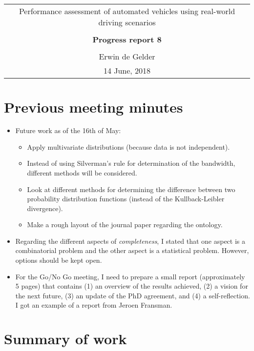 \documentclass[10pt,final,a4paper,oneside,onecolumn]{article}
\newcommand{\progressreportnumber}{8}
\renewcommand{\author}{Erwin de Gelder}
\renewcommand{\date}{14 June, 2018}
\renewcommand{\title}{Performance assessment of automated vehicles using real-world driving scenarios}
\begin{document}
	
\begin{center}
	\begin{tabular}{c}
		\title \\ \\
		\textbf{\huge Progress report \progressreportnumber} \\ \\
		\author \\ 
		\date
	\end{tabular}
\end{center}

\section{Previous meeting minutes}

\begin{itemize}
	\item Future work as of the 16th of May:
	\begin{itemize}
		\item Apply multivariate distributions (because data is not independent).
		\item Instead of using Silverman's rule for determination of the bandwidth, different methods will be considered.
		\item Look at different methods for determining the difference between two probability distribution functions (instead of the Kullback-Leibler divergence).
		\item Make a rough layout of the journal paper regarding the ontology.
	\end{itemize}
	\item Regarding the different aspects of \emph{completeness}, I stated that one aspect is a combinatorial problem and the other aspect is a statistical problem. However, options should be kept open.
	\item For the Go/No Go meeting, I need to prepare a small report (approximately 5 pages) that contains (1) an overview of the results achieved, (2) a vision for the next future, (3) an update of the PhD agreement, and (4) a self-reflection. I got an example of a report from Jeroen Fransman.
\end{itemize}

\section{Summary of work}
\end{document}
